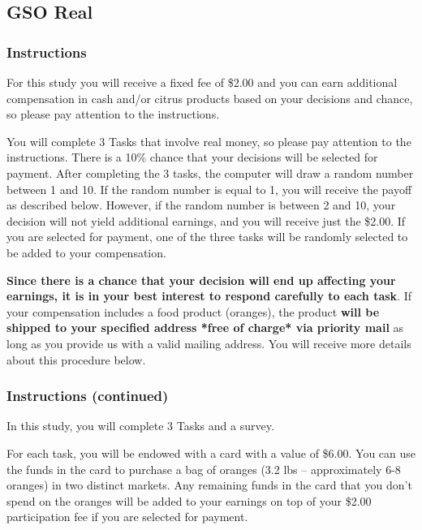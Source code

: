 \documentclass[12pt]{article}
\begin{document}
\clearpage



\subsection{GSO Real}

\subsubsection*{Instructions}

For this study you will receive a fixed fee of \$2.00 and you can earn additional compensation in cash and/or citrus products based on your decisions and chance, so please pay attention to the instructions.
 
You will complete 3 Tasks that involve real money, so please pay attention to the instructions. There is a 10\% chance that your decisions will be selected for payment. After completing the 3 tasks, the computer will draw a random number between 1 and 10. If the random number is equal to 1, you will receive the payoff as described below.
However, if the random number is between 2 and 10, your decision will not yield additional earnings, and you will receive just the \$2.00. If you are selected for payment, one of the three tasks will be randomly selected to be added to your compensation.

\textbf{Since there is a chance that your decision will end up affecting your earnings, it is in your best interest to respond carefully to each task}. If your compensation includes a food product (oranges), the product \textbf{will be shipped to your specified address *free of charge* via priority mail} as long as you provide us with a valid mailing address. You will receive more details about this procedure below.


\clearpage

\subsubsection*{Instructions (continued)}

In this study, you will complete 3 Tasks and a survey.

For each task, you will be endowed with a card with a value of \$6.00. You can use the funds in the card to purchase a bag of oranges (3.2 lbs – approximately 6-8 oranges) in two distinct markets. Any remaining funds in the card that you don’t spend on the oranges will be added to your earnings on top of your \$2.00 participation fee if you are selected for payment.
\end{document}
